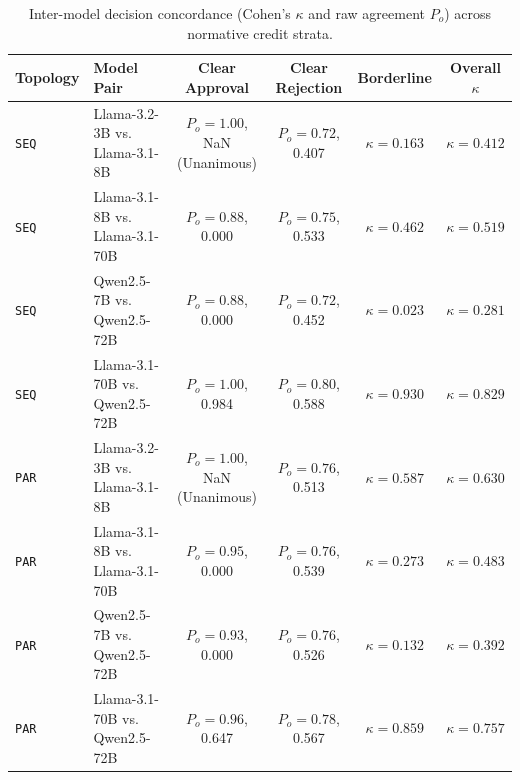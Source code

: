 \begin{table}[t]
\centering
\caption{Inter-model decision concordance (Cohen's $\kappa$ and raw agreement $P_o$) across normative credit strata.}
\label{tab:app_concordance}
\vspace{2pt}
\scriptsize
\setlength{\tabcolsep}{4pt}
\begin{tabular}{@{}llcccc@{}}
\toprule
\textbf{Topology} & \textbf{Model Pair} & \textbf{Clear Approval} & \textbf{Clear Rejection} & \textbf{Borderline} & \textbf{Overall $\kappa$} \\
\midrule
\texttt{SEQ} & Llama-3.2-3B vs. Llama-3.1-8B & $P_o=1.00$, NaN (Unanimous) & $P_o=0.72$, 0.407 & $\kappa=0.163$ & $\kappa=0.412$ \\
\texttt{SEQ} & Llama-3.1-8B vs. Llama-3.1-70B & $P_o=0.88$, 0.000 & $P_o=0.75$, 0.533 & $\kappa=0.462$ & $\kappa=0.519$ \\
\texttt{SEQ} & Qwen2.5-7B vs. Qwen2.5-72B & $P_o=0.88$, 0.000 & $P_o=0.72$, 0.452 & $\kappa=0.023$ & $\kappa=0.281$ \\
\texttt{SEQ} & Llama-3.1-70B vs. Qwen2.5-72B & $P_o=1.00$, 0.984 & $P_o=0.80$, 0.588 & $\kappa=0.930$ & $\kappa=0.829$ \\
\texttt{PAR} & Llama-3.2-3B vs. Llama-3.1-8B & $P_o=1.00$, NaN (Unanimous) & $P_o=0.76$, 0.513 & $\kappa=0.587$ & $\kappa=0.630$ \\
\texttt{PAR} & Llama-3.1-8B vs. Llama-3.1-70B & $P_o=0.95$, 0.000 & $P_o=0.76$, 0.539 & $\kappa=0.273$ & $\kappa=0.483$ \\
\texttt{PAR} & Qwen2.5-7B vs. Qwen2.5-72B & $P_o=0.93$, 0.000 & $P_o=0.76$, 0.526 & $\kappa=0.132$ & $\kappa=0.392$ \\
\texttt{PAR} & Llama-3.1-70B vs. Qwen2.5-72B & $P_o=0.96$, 0.647 & $P_o=0.78$, 0.567 & $\kappa=0.859$ & $\kappa=0.757$ \\
\bottomrule
\end{tabular}
\end{table}